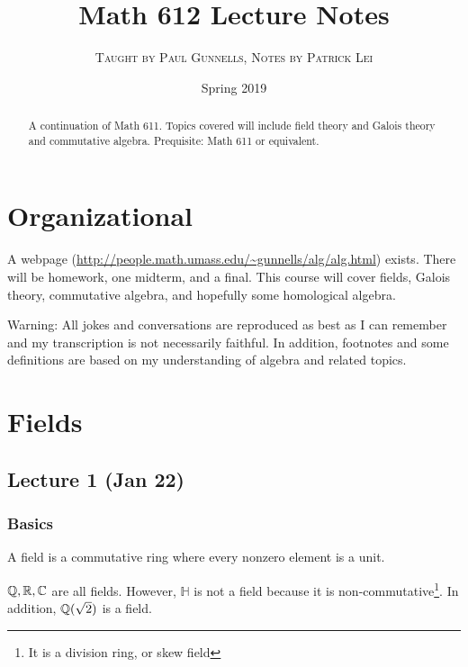 \documentclass[10pt, twoside]{article}
\title{Math 612 Lecture Notes}
\author{\scshape Taught by Paul Gunnells, Notes by Patrick Lei}
\affil{\itshape University of Massachusetts, Amherst}
\date{Spring 2019}
\begin{document}
    \maketitle\thispagestyle{firstpage}
    
    \begin{abstract}
        A continuation of Math 611. Topics covered will include field theory and Galois theory and commutative algebra. Prequisite: Math 611 or equivalent.
    \end{abstract}

    \tableofcontents

    \section{Organizational}
    A webpage (\url{http://people.math.umass.edu/~gunnells/alg/alg.html}) exists. There will be homework, one midterm, and a final. This course will cover fields, Galois theory, commutative algebra, and hopefully some homological algebra.

    Warning: All jokes and conversations are reproduced as best as I can remember and my transcription is not necessarily faithful. In addition, footnotes and some definitions are based on my understanding of algebra and related topics.

    \section{Fields}

    \subsection{Lecture 1 (Jan 22)}

    \subsubsection{Basics}

    \begin{defn}[Field]
        A field is a commutative ring where every nonzero element is a unit.
    \end{defn}

    \begin{exm}
        $\mathbb{Q}, \mathbb{R}, \mathbb{C}$ are all fields. However, $\mathbb{H}$ is not a field because it is non-commutative\footnote{It is a division ring, or skew field}. In addition, $\mathbb{Q}(\sqrt{2})$ is a field.
    \end{exm}
\end{document}

